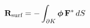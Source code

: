 \documentclass[preview]{standalone}
\begin{document}
\begin{align*}
\special{dvisvgm:raw <g id='unique000'>}\mathbf{R}_{\text{surf}} = -\int_{\partial K} \boldsymbol{\phi}\, \mathbf{F}^{*}\, dS\special{dvisvgm:raw </g>}
\end{align*}
\end{document}
